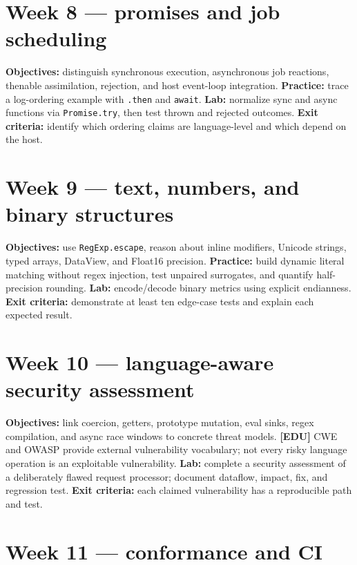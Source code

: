 \documentclass[11pt,letterpaper]{article}
\newcommand{\passthrough}[1]{#1}
\begin{document}
\section{Week 8 --- promises and job scheduling}\label{week-8-promises-and-job-scheduling}

\textbf{Objectives:} distinguish synchronous execution, asynchronous job reactions, thenable assimilation, rejection, and host event-loop integration. \textbf{Practice:} trace a log-ordering example with \passthrough{\lstinline!.then!} and \passthrough{\lstinline!await!}. \textbf{Lab:} normalize sync and async functions via \passthrough{\lstinline!Promise.try!}, then test thrown and rejected outcomes. \textbf{Exit criteria:} identify which ordering claims are language-level and which depend on the host.

\section{Week 9 --- text, numbers, and binary structures}\label{week-9-text-numbers-and-binary-structures}

\textbf{Objectives:} use \passthrough{\lstinline!RegExp.escape!}, reason about inline modifiers, Unicode strings, typed arrays, DataView, and Float16 precision. \textbf{Practice:} build dynamic literal matching without regex injection, test unpaired surrogates, and quantify half-precision rounding. \textbf{Lab:} encode/decode binary metrics using explicit endianness. \textbf{Exit criteria:} demonstrate at least ten edge-case tests and explain each expected result.

\section{Week 10 --- language-aware security assessment}\label{week-10-language-aware-security-assessment}

\textbf{Objectives:} link coercion, getters, prototype mutation, eval sinks, regex compilation, and async race windows to concrete threat models. \textbf{{[}EDU{]}} CWE and OWASP provide external vulnerability vocabulary; not every risky language operation is an exploitable vulnerability. \textbf{Lab:} complete a security assessment of a deliberately flawed request processor; document dataflow, impact, fix, and regression test. \textbf{Exit criteria:} each claimed vulnerability has a reproducible path and test.

\section{Week 11 --- conformance and CI}\label{week-11-conformance-and-ci}
\end{document}
